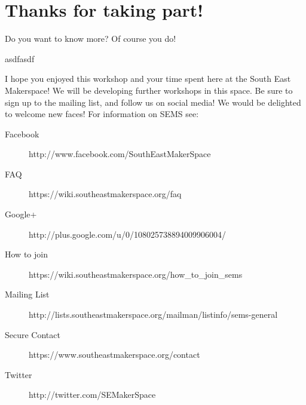 \newpage
\chapter*{Thanks for taking part!}

Do you want to know more? Of course you do!

asdfasdf

I hope you enjoyed this workshop and your time spent here at the South East Makerspace! We will be developing further workshops in this space. Be sure to sign up to the mailing list, and follow us on social media!  We would be delighted to welcome new faces! For information on SEMS see:

\begin{description}
	\item[Facebook] http://www.facebook.com/SouthEastMakerSpace
	\item[FAQ] https://wiki.southeastmakerspace.org/faq
	\item[Google+] http://plus.google.com/u/0/108025738894009906004/
	\item[How to join] https://wiki.southeastmakerspace.org/how\_to\_join\_sems
	\item[Mailing List] http://lists.southeastmakerspace.org/mailman/listinfo/sems-general
	\item[Secure Contact] https://www.southeastmakerspace.org/contact
	\item[Twitter] http://twitter.com/SEMakerSpace
\end{description} 




